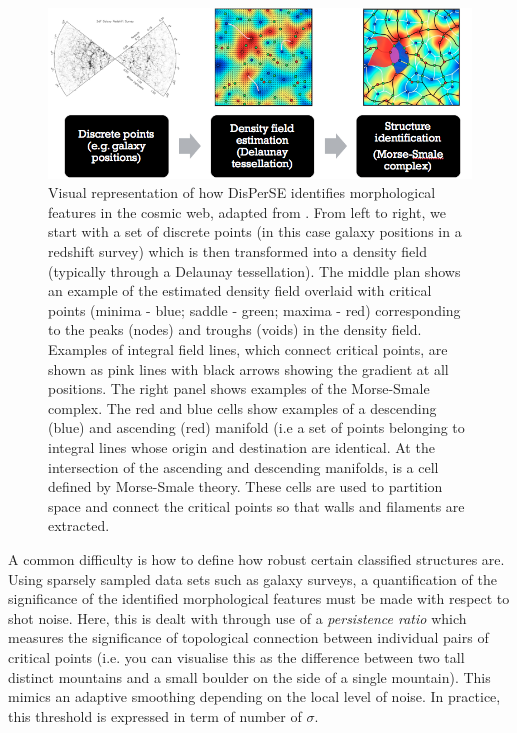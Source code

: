 \begin{figure}
    \centering
	\includegraphics[width=\linewidth]{thesis/latex/introduction/disperse_visual.png}
    \caption{Visual representation of how DisPerSE identifies morphological features in the cosmic web, adapted from \citet{sousbie2011a}. From left to right, we start with a set of discrete points (in this case galaxy positions in a redshift survey) which is then transformed into a density field (typically through a Delaunay tessellation). The middle plan shows an example of the estimated density field overlaid with critical points (minima - blue; saddle - green; maxima - red) corresponding to the peaks (nodes) and troughs (voids) in the density field. Examples of integral field lines, which connect critical points, are shown as pink lines with black arrows showing the gradient at all positions. The right panel shows examples of the Morse-Smale complex. The red and blue cells show examples of a descending (blue) and ascending (red) manifold (i.e a set of points belonging to integral lines whose origin and destination are identical. At the intersection of the ascending and descending manifolds, is a cell defined by Morse-Smale theory. These cells are used to partition space and connect the critical points so that walls and filaments are extracted.}
    \label{fig:disperse_visual}
\end{figure}

A common difficulty is how to define how robust certain classified structures are. Using sparsely sampled data sets such as galaxy surveys, a quantification of the significance of the identified morphological features must be made with respect to shot noise. Here, this is dealt with through use of a \textit{persistence ratio} which measures the significance of topological connection between individual pairs of critical points (i.e. you can visualise this as the difference between two tall distinct mountains and a small boulder on the side of a single mountain). This mimics an adaptive smoothing depending on the local level of noise. In practice, this threshold is expressed in term of number of $\sigma$.  

